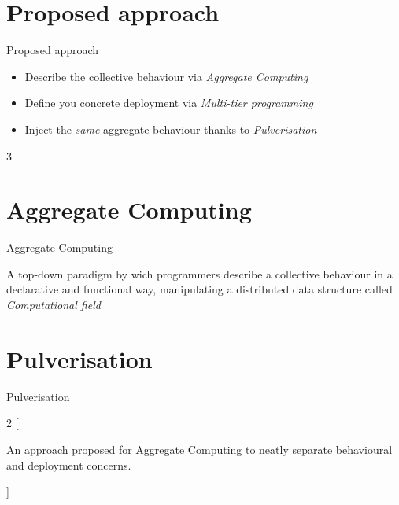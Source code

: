 \documentclass[aspectratio=169]{beamer}
\begin{document}
\section{Proposed approach}
\begin{frame}{Proposed approach}

\begin{card}
{ 
  \begin{itemize}
  \item<1-> Describe the collective behaviour via {\color{accent} \textit{Aggregate Computing}}
  \item<2-> Define you concrete deployment via {\color{accent} \textit{Multi-tier programming}}
  \item<3-> Inject the {\color{accent} \textit{same}} aggregate behaviour thanks to {\color{accent} \textit{Pulverisation}}
  \end{itemize}
}
\end{card}
\begin{multicols}{3}
\end{multicols}
\end{frame}

\section{Aggregate Computing}
\begin{frame}{Aggregate Computing}
\begin{cardTiny}
{\color{accent} A top-down paradigm by wich programmers describe 
 a collective behaviour in a declarative and functional way,
 manipulating a distributed data structure called \textit{Computational field} }
\end{cardTiny}
\centering
{}
\end{frame}

\section{Pulverisation}
\begin{frame}{Pulverisation}
\begin{multicols}{2}
[
  \begin{cardTiny}
  {\color{accent} An approach proposed for Aggregate Computing to neatly separate behavioural and deployment concerns. }
  \end{cardTiny}
]
\centering
\pause
{} 
\pause
{}
\end{multicols}
\end{frame}
\end{document}
